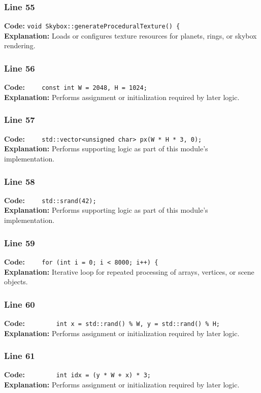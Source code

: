 \documentclass[11pt,a4paper]{article}
\begin{document}
\subsubsection*{Line 55}
\textbf{Code:} \verb|void Skybox::generateProceduralTexture() {|\\
\textbf{Explanation:} Loads or configures texture resources for planets, rings, or skybox rendering.

\subsubsection*{Line 56}
\textbf{Code:} \verb|    const int W = 2048, H = 1024;|\\
\textbf{Explanation:} Performs assignment or initialization required by later logic.

\subsubsection*{Line 57}
\textbf{Code:} \verb|    std::vector<unsigned char> px(W * H * 3, 0);|\\
\textbf{Explanation:} Performs supporting logic as part of this module's implementation.

\subsubsection*{Line 58}
\textbf{Code:} \verb|    std::srand(42);|\\
\textbf{Explanation:} Performs supporting logic as part of this module's implementation.

\subsubsection*{Line 59}
\textbf{Code:} \verb|    for (int i = 0; i < 8000; i++) {|\\
\textbf{Explanation:} Iterative loop for repeated processing of arrays, vertices, or scene objects.

\subsubsection*{Line 60}
\textbf{Code:} \verb|        int x = std::rand() % W, y = std::rand() % H;|\\
\textbf{Explanation:} Performs assignment or initialization required by later logic.

\subsubsection*{Line 61}
\textbf{Code:} \verb|        int idx = (y * W + x) * 3;|\\
\textbf{Explanation:} Performs assignment or initialization required by later logic.
\end{document}

